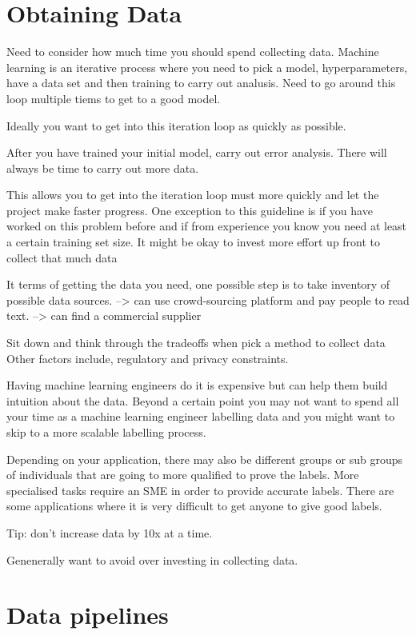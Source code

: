 \section{Obtaining Data}

Need to consider how much time you should spend collecting data.
Machine learning is an iterative process where you need to pick a model, hyperparameters, have a data set and then training to carry out analusis.
Need to go around this loop multiple tiems to get to a good model.

Ideally you want to get into this iteration loop as quickly as possible.

After you have trained your initial model, carry out error analysis.
There will always be time to carry out more data.

This allows you to get into the iteration loop must more quickly and let the project make faster progress.
One exception to this guideline is if you have worked on this problem before and if from experience you know you need at least a certain training set size.
It might be okay to invest more effort up front to collect that much data

It terms of getting the data you need, one possible step is to take inventory of possible data sources.
--> can use crowd-sourcing  platform and pay people to read text.
--> can find a commercial supplier

Sit down and think through the tradeoffs when pick a method to collect data
Other factors include, regulatory and privacy constraints.

Having machine learning engineers do it is expensive but can help them build intuition about the data.
Beyond a certain point you may not want to spend all your time as a machine learning engineer labelling data and you might want to skip to a more scalable labelling process.

Depending on your application, there may also be different groups or sub groups of individuals that are going to more qualified to prove the labels.
More specialised tasks require an SME in order to provide accurate labels.
There are some applications where it is very difficult to get anyone to give good labels.

Tip: don't increase data by 10x at a time.

Genenerally want to avoid over investing in collecting data.


\section{Data pipelines}

